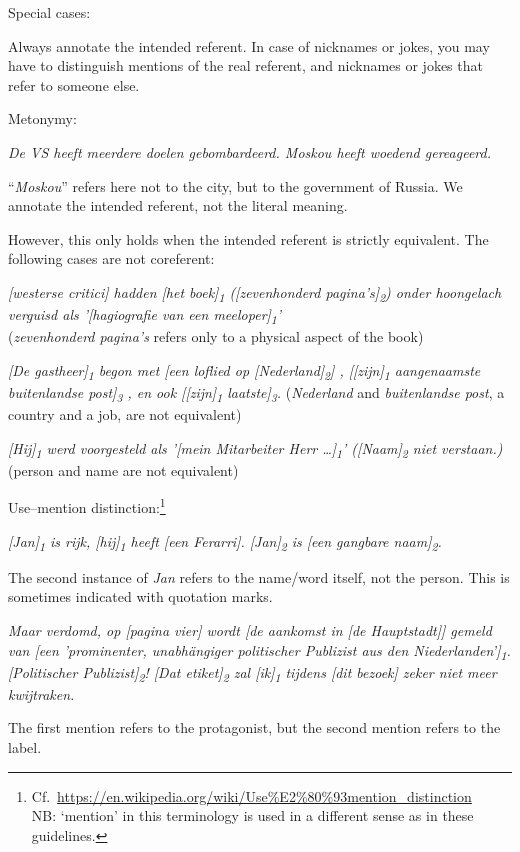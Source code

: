 Special cases:
\begin{itemize*}
\item Always annotate the intended referent. In case of nicknames or jokes,
    you may have to distinguish mentions of the real referent, and nicknames or jokes that refer to someone else.

\item Metonymy:

    \emph{De VS heeft meerdere doelen gebombardeerd. Moskou heeft woedend
  gereageerd.}

  ``\emph{Moskou}'' refers here not to the city, but to the government of
  Russia. We annotate the intended referent, not the literal meaning.

    However, this only holds when the intended referent is strictly equivalent. The following cases are not coreferent:
    \begin{itemize*}
    \item \emph{[westerse critici] hadden [het boek]\textsubscript{1} ([zevenhonderd pagina's]\textsubscript{2}) onder hoongelach verguisd als '[hagiografie van een meeloper]\textsubscript{1}'} \\
    (\emph{zevenhonderd pagina's} refers only to a physical aspect of
    the book)
    \item \emph{[De gastheer]\textsubscript{1} begon met [een loflied op [Nederland]\textsubscript{2}] , [[zijn]\textsubscript{1} aangenaamste buitenlandse post]\textsubscript{3} , en ook [[zijn]\textsubscript{1} laatste]\textsubscript{3}.} (\emph{Nederland} and \emph{buitenlandse post}, a country and a job, are not equivalent)
    \item \emph{[Hij]\textsubscript{1} werd voorgesteld als '[mein Mitarbeiter Herr \dots]\textsubscript{1}'
([Naam]\textsubscript{2} niet verstaan.)} (person and name are not equivalent)
    \end{itemize*}

\item Use--mention distinction:\footnote{%
    Cf.\ \url{https://en.wikipedia.org/wiki/Use\%E2\%80\%93mention_distinction}\\
    NB: `mention' in this terminology is used in a different sense as
    in these guidelines.
    }

    \emph{[Jan]\textsubscript{1} is rijk, [hij]\textsubscript{1} heeft [een Ferarri].
    [Jan]\textsubscript{2} is [een gangbare naam]\textsubscript{2}.}

    The second instance of \emph{Jan} refers to the name/word itself,
    not the person. This is sometimes indicated with quotation marks.

    \emph{Maar verdomd, op [pagina vier] wordt [de aankomst in [de Hauptstadt]] gemeld van [een 'prominenter, unabhängiger politischer Publizist aus den Niederlanden']\textsubscript{1}.
    [Politischer Publizist]\textsubscript{2}!
    [Dat etiket]\textsubscript{2} zal [ik]\textsubscript{1} tijdens [dit bezoek] zeker niet meer kwijtraken.}

    The first mention refers to the protagonist,
    but the second mention refers to the label.

\end{itemize*}


